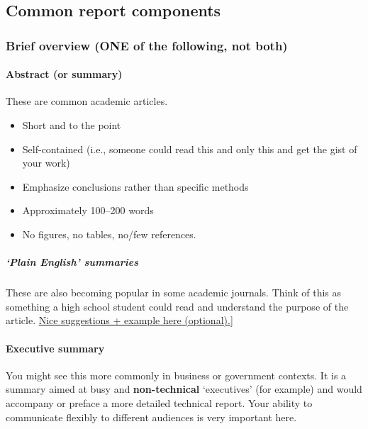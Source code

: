 \documentclass[
  openany]{book}
\providecommand{\tightlist}{%
  \setlength{\itemsep}{0pt}\setlength{\parskip}{0pt}}
\begin{document}
\hypertarget{common-report-components}{%
\subsection{Common report components}\label{common-report-components}}

\hypertarget{brief-overview-one-of-the-following-not-both}{%
\subsubsection{Brief overview (ONE of the following, not both)}\label{brief-overview-one-of-the-following-not-both}}

\hypertarget{abstract-or-summary}{%
\paragraph{Abstract (or summary)}\label{abstract-or-summary}}

These are common academic articles.

\begin{itemize}
\tightlist
\item
  Short and to the point
\item
  Self-contained (i.e., someone could read this and only this and get the gist of your work)
\item
  Emphasize conclusions rather than specific methods
\item
  Approximately 100--200 words
\item
  No figures, no tables, no/few references.
\end{itemize}

\hypertarget{plain-english-summaries}{%
\subparagraph{`Plain English' summaries}\label{plain-english-summaries}}

These are also becoming popular in some academic journals. Think of this as something a high school student could read and understand the purpose of the article. \href{https://www.agu.org/-/media/Files/Share-and-Advocate-for-Science/ToolkitPLS.pdf}{Nice suggestions + example here (optional).}{]}

\hypertarget{executive-summary}{%
\paragraph{Executive summary}\label{executive-summary}}

You might see this more commonly in business or government contexts. It is a summary aimed at busy and \textbf{non-technical} `executives' (for example) and would accompany or preface a more detailed technical report. Your ability to communicate flexibly to different audiences is very important here.
\end{document}
